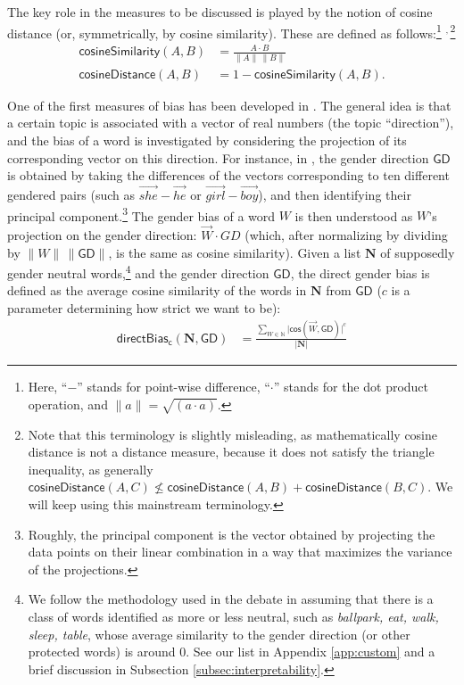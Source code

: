 \documentclass{clv3}
\begin{document}
The key role in the measures to be discussed is played by the notion of
cosine distance (or, symmetrically, by cosine similarity). These are
defined as follows:\footnote{Here, ``\(-\)'' stands for point-wise
  difference, ``\(\cdot\)'' stands for the dot product operation, and
  \(\lVert a\rVert = \sqrt{(a \cdot a)}\).}
\(^{\!\!\! , \,}\)\footnote{Note that this terminology is slightly
  misleading, as mathematically cosine distance is not a distance
  measure, because it does not satisfy the triangle inequality, as
  generally
  \(\mathsf{cosineDistance}(A,C) \not \leq \mathsf{cosineDistance}(A,B)+ \mathsf{cosineDistance}(B,C)\).
  We will keep using this mainstream terminology.}
\begin{align} \tag{Sim}
\mathsf{cosineSimilarity}(A,B) & = \frac{A \cdot B}{\lVert  A \rVert \,\lVert B \rVert}
\\
\tag{Distance}
\mathsf{cosineDistance}(A,B) &  = 1 - \mathsf{cosineSimilarity}(A,B).
\end{align}

One of the first measures of bias has been developed in \citep{Bolukbasi2016man}. The
general idea is that a certain topic is associated with a vector of real
numbers (the topic ``direction''), and the bias of a word is
investigated by considering the projection of its corresponding vector
on this direction. For instance, in \citep{Bolukbasi2016man}, the gender direction
\(\mathsf{GD}\) is obtained by taking the differences of the vectors
corresponding to ten different gendered pairs (such as
\(\overrightarrow{she} - \overrightarrow{he}\) or
\(\overrightarrow{girl} - \overrightarrow{boy}\)), and then identifying
their principal component.\footnote{Roughly, the principal component is
  the vector obtained by projecting the data points on their linear
  combination in a way that maximizes the variance of the projections.}
The gender bias of a word \(W\) is then understood as \(W\)'s projection
on the gender direction: \(\vec{W} \cdot GD\) (which, after normalizing
by dividing by \(\lVert W \rVert \,\lVert \mathsf{GD} \rVert\), is the
same as cosine similarity). Given a list \(\mathbf{N}\) of supposedly gender
neutral words,\footnote{We follow the methodology used in the debate in
  assuming that there is a class of words identified as more or less
  neutral, such as \emph{ballpark, eat, walk, sleep, table}, whose
  average similarity to the gender direction (or other protected words)
  is around 0. See our list in Appendix \ref{app:custom} and a brief
  discussion in Subsection \ref{subsec:interpretability}.} and the
gender direction \(\mathsf{GD}\), the direct gender bias is defined as
the average cosine similarity of the words in \(\mathbf{N}\) from \(\mathsf{GD}\)
(\(c\) is a parameter determining how strict we want to be):
\begin{align*}
\mathsf{directBias_c(\mathbf{N},GD)} & = \frac{\sum_{W\in \mathbb{N}}\vert \mathsf{cos}(\vec{W},\mathsf{GD})\vert^c}{\vert \mathbf{N} \vert }
\end{align*} \normalsize 
\end{document}
